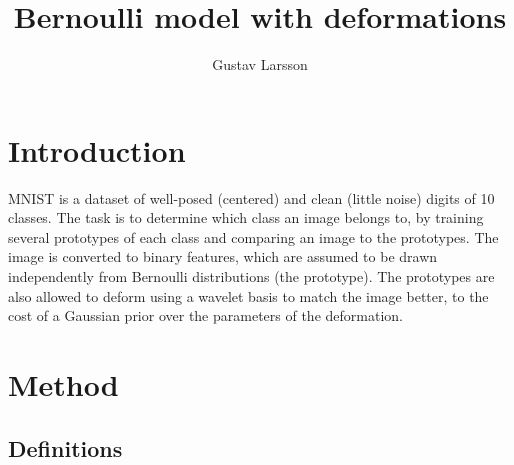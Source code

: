 \documentclass{article}
\begin{document}
\title{Bernoulli model with deformations}

\author{Gustav Larsson}

\maketitle

%
%
%
\section{Introduction}
MNIST is a dataset of well-posed (centered) and clean (little noise) digits of 10 classes. The task is to determine which class an image belongs to, by training several prototypes of each class and comparing an image to the prototypes. The image is converted to binary features, which are assumed to be drawn independently from Bernoulli distributions (the prototype).
The prototypes are also allowed to deform using a wavelet basis to match the image better, to the cost of a Gaussian prior over the parameters of the deformation.

\section{Method}


\subsection{Definitions}
\end{document}
